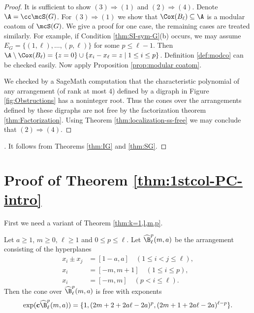  
 \begin{proof} 
It is sufficient to show $(3) \Rightarrow (1)$ and  $ (2)\Rightarrow (4)$. 
Denote $\A=\cc\mcS(G)$.
For $(3) \Rightarrow (1)$ we show that $\Cox(B_\ell)\subseteq \A$ is a modular coatom of $\mcS(G)$. 
We give a proof for one case, the remaining cases are treated similarly. 
For example, if Condition \ref{thm:SI-sym-G}(b) occurs, we may assume $E_G=\{(1,\ell),\ldots, (p,\ell)\}$ for some $p \le \ell-1$. 
Then $\A \setminus \Cox(B_\ell) =\{z=0\} \cup \{x_i - x_\ell =z \mid 1 \le i \le p\}$. 
Definition \ref{def:modco} can be checked easily. 
Now apply  Proposition \ref{prop:modular coatom}. 
 
We checked by a SageMath computation that the characteristic polynomial of any arrangement (of rank at most $4$) defined by a digraph in Figure \ref{fig:Obstructions} has a noninteger root. 
Thus the cones over the arrangements defined by these digraphs are not free by the factorization theorem \ref{thm:Factorization}. 
Using Theorem \ref{thm:localization-ss-free} we may conclude that $ (2)\Rightarrow (4)$. 
 \end{proof} 
 

\begin{proof}[]
 It follows from Theorems  \ref{thm:IG} and  \ref{thm:SG}.
 \end{proof} 

\section{Proof of Theorem  \ref{thm:1stcol-PC-intro}}
\label{sec:CQP-PC}
\quad
First we need a variant of Theorem \ref{thm:k=1,l,m,p}.
\begin{theorem}
 \label{thm:k=1,l,m,p-hat}
Let $a \ge 1$, $m\ge 0$,  $\ell \ge 1$ and $0 \le p \le \ell$. 
Let $\widehat{\B}^p_\ell(m,a)$ be the arrangement consisting of the hyperplanes
\begin{align*}
x_{i}\pm x_{j} &= [1-a , a]\quad  (1 \leq i < j \leq \ell), \\
x_i&=  [-m , m+1] \quad (1 \leq   i \leq p), \\
x_i&=[-m , m]  \quad (p<  i \leq \ell).
\end{align*}
Then the cone over $ \widehat\B^p_\ell(m,a)$
is   free with exponents 
$$\exp(\textbf{c} \widehat\B^p_\ell(m, a)) = \{1, (2m+2+2a\ell-2a)^{p}, (2m+1+2a\ell-2a)^{\ell-p}\}.$$ 
 \end{theorem} 
 
